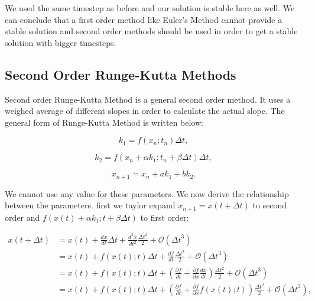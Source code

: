 \documentclass[11pt]{article}
\begin{document}
    We used the same timestep as before and our solution is stable here as
well. We can conclude that a first order method like Euler's Method
cannot provide a stable solution and second order methods should be used
in order to get a stable solution with bigger timesteps.

    \hypertarget{second-order-runge-kutta-methods}{%
\subsection{Second Order Runge-Kutta
Methods}\label{second-order-runge-kutta-methods}}

Second order Runge-Kutta Method is a general second order method. It
uses a weighed average of different slopes in order to calculate the
actual slope. The general form of Runge-Kutta Method is written below:

\begin{equation}
    k_1 = f(x_n;t_n)\Delta t,
\end{equation}

\begin{equation}
    k_2 = f(x_n + \alpha k_1; t_n + \beta\Delta t)\Delta t,
\end{equation}

\begin{equation}\label{eq:2nd_order_Runge_Kutta_Method}
    x_{n+1} = x_n + a k_1 + b k_2.
\end{equation}

We cannot use any value for these parameters. We now derive the
relationship between the parameters. first we taylor expand
\(x_{n+1}=x(t + \Delta t)\) to second order and
\(f(x(t) + \alpha k_1; t + \beta\Delta t)\) to first order:

\begin{equation}\label{eq:taylor_expansion_of_x}
    \begin{split}
        x(t + \Delta t) &= x(t) + \frac{dx}{dt} \Delta t + \frac{d^2 x}{{dt}^2}\frac{{\Delta t}^2}{2} + \mathscr{O}({\Delta t}^3) \\ &= x(t) + f(x(t);t) \Delta t + \frac{df}{dt} \frac{{\Delta t}^2}{2} + \mathscr{O}({\Delta t}^3) \\ &= x(t) + f(x(t);t) \Delta t + (\frac{\partial f}{\partial t} + \frac{\partial f}{\partial x}\frac{dx}{dt}) \frac{{\Delta t}^2}{2} + \mathscr{O}({\Delta t}^3) \\ &= x(t) + f(x(t);t) \Delta t + (\frac{\partial f}{\partial t} + \frac{\partial f}{\partial x}f(x(t);t)) \frac{{\Delta t}^2}{2} + \mathscr{O}({\Delta t}^3),
    \end{split}
\end{equation}
\end{document}
